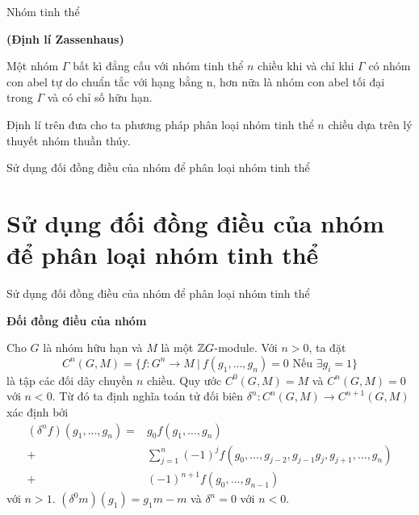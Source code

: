 \begin{frame}{Nhóm tinh thể}
    \begin{theorem1}{\textbf{(Định lí Zassenhaus)}}

        Một nhóm $\Gamma$ bất kì đẳng cấu với nhóm tinh thể $n$ chiều khi và chỉ khi $\Gamma$ có nhóm con abel tự do chuẩn tắc với hạng bằng n, hơn nữa là nhóm con abel tối đại trong $\Gamma$ và có chỉ số hữu hạn.
    \end{theorem1}
    Định lí trên đưa cho ta phương pháp phân loại nhóm tinh thể $n$ chiều dựa trên lý thuyết nhóm thuần thúy.
\end{frame}

\begin{frame}{Sử dụng đối đồng điều của nhóm để phân loại nhóm tinh thể}
    \section{Sử dụng đối đồng điều của nhóm để phân loại nhóm tinh thể}
\end{frame}

\begin{frame}{Sử dụng đối đồng điều của nhóm để phân loại nhóm tinh thể}
    \begin{center}
        \Large{\textbf{Đối đồng điều của nhóm}}
    \end{center}

    \begin{define}
        Cho $G$ là nhóm hữu hạn và $M$ là một $\mathbb Z G$-module. Với $n > 0$, ta đặt
        $$
            C^n(G,M) = \{ f: G^n \rightarrow M\ |\ f(g_1,...,g_n) = 0 \text{ Nếu } \exists g_i = 1 \}
        $$
        là tập các \alert{đối dây chuyền $n$ chiều}. Quy ước $C^0(G,M) = M$ và $C^n(G,M) = 0$ với $n < 0$. Từ đó ta định nghĩa toán tử đối biên $\delta^n: C^n(G,M) \rightarrow C^{n+1}(G,M)$ xác định bởi
        \begin{align*}
            (\delta^n f)(g_1,...,g_n) = &g_0f(g_1,...,g_n)\\
            +&\sum_{j=1}^n (-1)^j f(g_0,...,g_{j-2},g_{j-1}g_j,g_{j+1},...,g_n)\\
            +& (-1)^{n+1} f(g_0,...,g_{n-1})
        \end{align*}
        với $n > 1$. $(\delta^0 m)(g_1) = g_1 m - m$ và $\delta^n = 0$ với $n < 0$.
    \end{define}
\end{frame}

